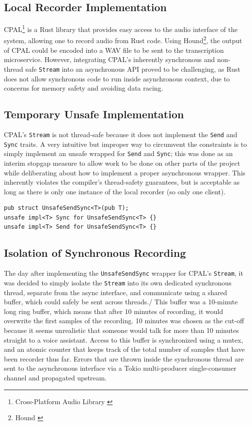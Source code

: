\subsection{Local Recorder Implementation}
CPAL\footnote{Cross-Platform Audio Library \cite{cpal}} is a Rust library that provides easy access to the audio interface of the system,
allowing one to record audio from Rust code. Using Hound\footnote{Hound \cite{hound}}, the output of CPAL could be encoded into a WAV file
to be sent to the transcription microservice. However, integrating CPAL's inherently synchronous and non-thread safe \texttt{Stream} into an asynchronous API
proved to be challenging, as Rust does not allow synchronous code to run inside asynchronous context, due to concerns for memory safety and avoiding data racing.

\subsection{Temporary Unsafe Implementation}
CPAL's \texttt{Stream} is not thread-safe because it does not implement the \texttt{Send} and \texttt{Sync} traits.
A very intuitive but improper way to circumvent the constraints is to simply implement an unsafe wrapped for \texttt{Send} and \texttt{Sync};
this was done as an interim stopgap measure to allow work to be done on other parts of the project while deliberating about how to implement a proper asynchronous wrapper.
This inherently violates the compiler's thread-safety guarantees, but is acceptable as long as there is only one instance of the local recorder (so only one client).

\begin{verbatim}
pub struct UnsafeSendSync<T>(pub T);
unsafe impl<T> Sync for UnsafeSendSync<T> {}
unsafe impl<T> Send for UnsafeSendSync<T> {}
\end{verbatim}

\subsection{Isolation of Synchronous Recording}
The day after implementing the \texttt{UnsafeSendSync} wrapper for CPAL's \texttt{Stream}, it was decided to simply isolate the \texttt{Stream}
into its own dedicated synchronous thread, separate from the async interface, and communicate using a shared buffer, which could safely be sent across threads./
This buffer was a 10-minute long ring buffer, which means that after 10 minutes of recording, it would overwrite the first samples of the recording.
10 minutes was chosen as the cut-off because it seems unrealistic that someone would talk for more than 10 minutes straight to a voice assistant.
Access to this buffer is synchronized using a mutex, and an atomic counter that keeps track of the total number of samples that have been recorder thus far.
Errors that are thrown inside the synchronous thread are sent to the asynchronous interface via a Tokio multi-producer single-consumer channel and propagated upstream.

